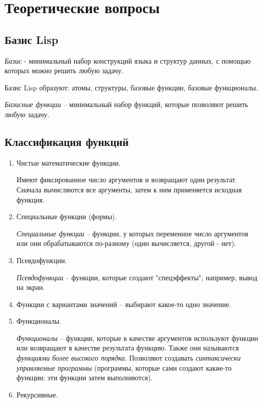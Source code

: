 \chapter{Теоретические вопросы}

\section{Базис Lisp}
\textit{Базис} - минимальный набор конструкций языка и структур данных, с  помощью которых можно решить любую задачу. 

Базис Lisp образуют: атомы, структуры, базовые функции, базовые функционалы.

\textit{Базисные функции} -- минимальный набор функций, которые позволяют решить любую задачу.

\section{Классификация функций}
\begin{enumerate}
	\item Чистые математические функции.
	
	Имеют фиксированное число аргументов и возвращают один результат. Сначала вычисляются все аргументы, затем к ним применяется исходная функция.
	
	\item Специальные функции (формы).
	
	\textit{Специальные функции} -- функции, у которых переменное число аргументов или они обрабатываются по-разному (один вычисляется, другой - нет).
	
	\item Псевдофункции.
	
	\textit{Псевдофункции} -- функции, которые создают "спецэффекты"; например, вывод на экран.
	
	\item Функции с вариантами значений -- выбирают какое-то одно значение.
	
	\item Функционалы.
	
	\textit{Функционалы} -- функции, которые в качестве аргументов используют функции или возвращают в качестве результата функцию. Также они называются \textit{функциями более высокого порядка}. Позволяют создавать \textit{синтаксически управляемые программы} (программы, которые сами создают какие-то функции; эти функции затем выполняются). 
	
	\item Рекурсивные.
\end{enumerate}

